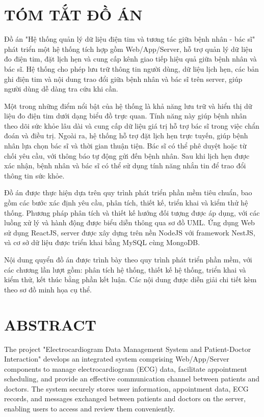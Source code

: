 \section*{TÓM TẮT ĐỒ ÁN}

Đồ án "Hệ thống quản lý dữ liệu điện tim và tương tác giữa bệnh nhân - bác sĩ" phát triển một hệ thống tích hợp gồm Web/App/Server, hỗ trợ quản lý dữ liệu đo điện tim, đặt lịch hẹn và cung cấp kênh giao tiếp hiệu quả giữa bệnh nhân và bác sĩ.
Hệ thống cho phép lưu trữ thông tin người dùng, dữ liệu lịch hẹn, các bản ghi điện tim và nội dung trao đổi giữa bệnh nhân và bác sĩ trên server, giúp người dùng dễ dàng tra cứu khi cần.

Một trong những điểm nổi bật của hệ thống là khả năng lưu trữ và hiển thị dữ liệu đo điện tim dưới dạng biểu đồ trực quan. Tính năng này giúp bệnh nhân theo dõi sức khỏe lâu dài và cung cấp dữ liệu giá trị hỗ trợ bác sĩ trong việc chẩn đoán và điều trị.
Ngoài ra, hệ thống hỗ trợ đặt lịch hẹn trực tuyến, giúp bệnh nhân lựa chọn bác sĩ và thời gian thuận tiện. Bác sĩ có thể phê duyệt hoặc từ chối yêu cầu, với thông báo tự động gửi đến bệnh nhân. Sau khi lịch hẹn được xác nhận, bệnh nhân và bác sĩ có thể sử dụng tính năng nhắn tin để trao đổi thông tin sức khỏe.

Đồ án được thực hiện dựa trên quy trình phát triển phần mềm tiêu chuẩn, bao gồm các bước xác định yêu cầu, phân tích, thiết kế, triển khai và kiểm thử hệ thống. Phương pháp phân tích và thiết kế hướng đối tượng được áp dụng, với các luồng xử lý và hành động được biểu diễn thông qua sơ đồ UML.
Ứng dụng Web sử dụng ReactJS, server được xây dựng trên nền NodeJS với framework NestJS, và cơ sở dữ liệu được triển khai bằng MySQL cùng MongoDB.

Nội dung quyển đồ án được trình bày theo quy trình phát triển phần mềm, với các chương lần lượt gồm: phân tích hệ thống, thiết kế hệ thống, triển khai và kiểm thử, kết thúc bằng phần kết luận. Các nội dung được diễn giải chi tiết kèm theo sơ đồ minh họa cụ thể.


\newpage
\section*{ABSTRACT}

The project "Electrocardiogram Data Management System and Patient-Doctor Interaction" develops an integrated system comprising Web/App/Server components to manage electrocardiogram (ECG) data, facilitate appointment scheduling, and provide an effective communication channel between patients and doctors.
The system securely stores user information, appointment data, ECG records, and messages exchanged between patients and doctors on the server, enabling users to access and review them conveniently.

